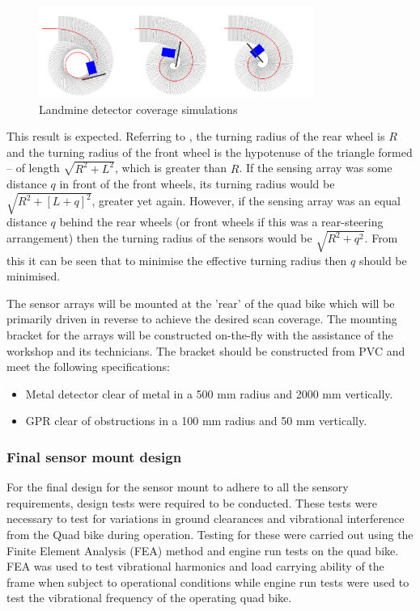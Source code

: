 \documentclass[main.tex]{subfiles}
\begin{document}
\begin{figure}[ht]
\includegraphics[width=0.8\textwidth]{4-DetailedDesign/Detector_Coverage.png}
\centering
\caption{Landmine detector coverage simulations} 
\end{figure}
This result is expected. Referring to , the turning radius of the rear wheel is $R$ and the turning radius of the front wheel is the hypotenuse of the triangle formed – of length $\sqrt{R^2 + L^2}$, which is greater than $R$. If the sensing array was some distance $q$ in front of the front wheels, its turning radius would be $\sqrt{R^2 + [L+q]^2}$, greater yet again. However, if the sensing array was an equal distance $q$ behind the rear wheels (or front wheels if this was a rear-steering arrangement) then the turning radius of the sensors would be $\sqrt{R^2 + q^2}$. From this it can be seen that to minimise the effective turning radius then $q$ should be minimised.

The sensor arrays will be mounted at the 'rear' of the quad bike which will be primarily driven in reverse to achieve the desired scan coverage. The mounting bracket for the arrays will be constructed on-the-fly with the assistance of the workshop and its technicians. The bracket should be constructed from PVC and meet the following specifications:
\begin{itemize}
\item Metal detector clear of metal in a 500 mm radius and 2000 mm vertically.
\item GPR clear of obstructions in a 100 mm radius and 50 mm vertically.
\end{itemize}

\subsubsection{Final sensor mount design}
For the final design for the sensor mount to adhere to all the sensory requirements, design tests were required to be conducted. These tests were necessary to test for variations in ground clearances and vibrational interference from the Quad bike during operation. Testing for these were carried out using the Finite Element Analysis (FEA) method and engine run tests on the quad bike. FEA was used to test vibrational harmonics and load carrying ability of the frame when subject to operational conditions while engine run tests were used to test the vibrational frequency of the operating quad bike. 
\end{document}
